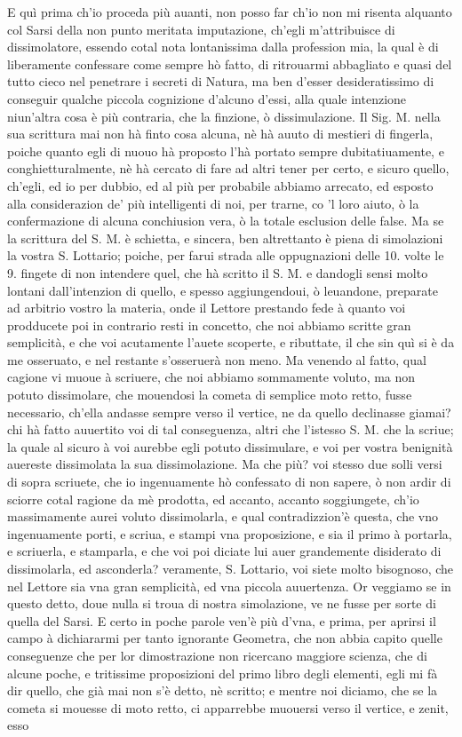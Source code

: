 \documentclass[11pt,twoside,openany]{book}
\begin{document}
E quì prima ch'io proceda più auanti, non posso far ch'io non mi risenta alquanto col Sarsi della non punto meritata imputazione, ch'egli m'attribuisce di dissimolatore, essendo cotal nota lontanissima dalla profession mia, la qual è di liberamente confessare come sempre hò fatto, di ritrouarmi abbagliato e quasi del tutto cieco nel penetrare i secreti di Natura, ma ben d'esser desideratissimo di conseguir qualche piccola cognizione d'alcuno d'essi, alla quale intenzione niun'altra cosa è più contraria, che la finzione, ò dissimulazione. Il Sig. M. nella sua scrittura mai non hà finto cosa alcuna, nè hà auuto di mestieri di fingerla, poiche quanto egli di nuouo hà proposto l'hà portato sempre dubitatiuamente, e conghietturalmente, nè hà cercato di fare ad altri tener per certo, e sicuro quello, ch'egli, ed io per dubbio, ed al più per probabile abbiamo arrecato, ed esposto alla considerazion de' più intelligenti di noi, per trarne, co 'l loro aiuto, ò la confermazione di alcuna conchiusion vera, ò la totale esclusion delle false. Ma se la scrittura del S. M. è schietta, e sincera, ben altrettanto è piena di simolazioni la vostra S. Lottario; poiche, per farui strada alle oppugnazioni delle 10. volte le 9. fingete di non intendere quel, che hà scritto il S. M. e dandogli sensi molto lontani dall'intenzion di quello, e spesso aggiungendoui, ò leuandone, preparate ad arbitrio vostro la materia, onde il Lettore prestando fede à quanto voi prodducete poi in contrario resti in concetto, che noi abbiamo scritte gran semplicità, e che voi acutamente l'auete scoperte, e ributtate, il che sin quì si è da me osseruato, e nel restante s'osseruerà non meno. Ma venendo al fatto, qual cagione vi muoue à scriuere, che noi abbiamo sommamente voluto, ma non potuto dissimolare, che mouendosi la cometa di semplice moto retto, fusse necessario, ch'ella andasse sempre verso il vertice, ne da quello declinasse giamai? chi hà fatto auuertito voi di tal conseguenza, altri che l'istesso S. M. che la scriue; la quale al sicuro à voi aurebbe egli potuto dissimulare, e voi per vostra benignità auereste dissimolata la sua dissimolazione. Ma che più? voi stesso due solli versi di sopra scriuete, che io ingenuamente hò confessato di non sapere, ò non ardir di sciorre cotal ragione da mè prodotta, ed accanto, accanto soggiungete, ch'io massimamente aurei voluto dissimolarla, e qual contradizzion'è questa, che vno ingenuamente porti, e scriua, e stampi vna proposizione, e sia il primo à portarla, e scriuerla, e stamparla, e che voi poi diciate lui auer grandemente disiderato di dissimolarla, ed asconderla? veramente, S. Lottario, voi siete molto bisognoso, che nel Lettore sia vna gran semplicità, ed vna piccola auuertenza. Or veggiamo se in questo detto, doue nulla si troua di nostra simolazione, ve ne fusse per sorte di quella del Sarsi. E certo in poche parole ven'è più d'vna, e prima, per aprirsi il campo à dichiararmi per tanto ignorante Geometra, che non abbia capito quelle conseguenze che per lor dimostrazione non ricercano maggiore scienza, che di alcune poche, e tritissime proposizioni del primo libro degli elementi, egli mi fà dir quello, che già mai non s'è detto, nè scritto; e mentre noi diciamo, che se la cometa si mouesse di moto retto, ci apparrebbe muouersi verso il vertice, e zenit, esso 
\end{document}
